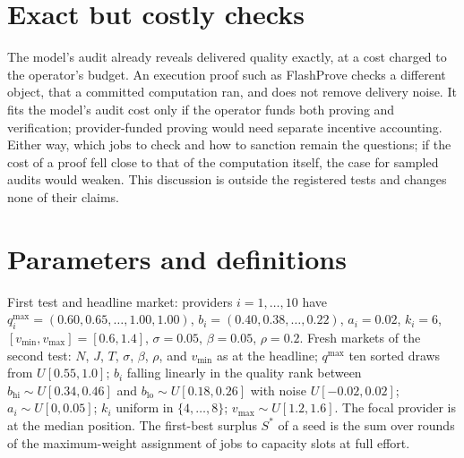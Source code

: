\documentclass[11pt]{article}
\begin{document}
\FloatBarrier
\section{Exact but costly checks}\label{sec:app-exact}
The model's audit already reveals delivered quality exactly, at a cost charged to the operator's budget. An execution proof such as FlashProve checks a different object, that a committed computation ran, and does not remove delivery noise. It fits the model's audit cost only if the operator funds both proving and verification; provider-funded proving would need separate incentive accounting. Either way, which jobs to check and how to sanction remain the questions; if the cost of a proof fell close to that of the computation itself, the case for sampled audits would weaken. This discussion is outside the registered tests and changes none of their claims.


\FloatBarrier
\section{Parameters and definitions}\label{sec:app-params}\label{app:params}
First test and headline market: providers $i = 1, \dots, 10$ have $q^{\max}_i = (0.60, 0.65, \dots, 1.00, 1.00)$, $b_i = (0.40, 0.38, \dots, 0.22)$, $a_i = 0.02$, $k_i = 6$, $[v_{\min}, v_{\max}] = [0.6, 1.4]$, $\sigma = 0.05$, $\beta = 0.05$, $\rho = 0.2$. Fresh markets of the second test: $N$, $J$, $T$, $\sigma$, $\beta$, $\rho$, and $v_{\min}$ as at the headline; $q^{\max}$ ten sorted draws from $U[0.55, 1.0]$; $b_i$ falling linearly in the quality rank between $b_{\mathrm{hi}} \sim U[0.34, 0.46]$ and $b_{\mathrm{lo}} \sim U[0.18, 0.26]$ with noise $U[-0.02, 0.02]$; $a_i \sim U[0, 0.05]$; $k_i$ uniform in $\{4, \dots, 8\}$; $v_{\max} \sim U[1.2, 1.6]$. The focal provider is at the median position. The first-best surplus $S^*$ of a seed is the sum over rounds of the maximum-weight assignment of jobs to capacity slots at full effort.

\begin{table}[h]\centering\small
{}
\caption{Development comparator selection (before the lock; development records): each credibility configuration's selected D2+H3 attack gain and gross efficiency at the inner search budget, and the two configurations rechecked at full budget, at the headline market and dev0, with R3's pacing and the fixed pair. Score: the development objective, the minimum over markets and families of the smaller of an efficiency margin and a gain margin, with the market and family that decide it; the efficiency margin was the smaller at every configuration.}\label{tab:comparator-dev}
\end{table}
\end{document}
